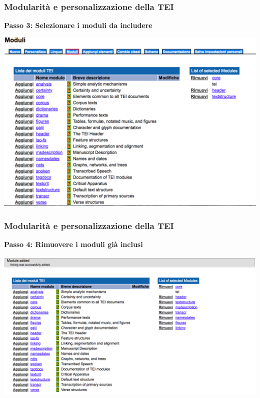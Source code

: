 \begin{frame}
    \frametitle{Modularità e personalizzazione della TEI}
    \addtocounter{nframe}{1}
    
    \textbf{Passo 3: Selezionare i moduli da includere}

     \begin{center}
        \includegraphics[width=.9\textwidth]{imgs/Roma4.png}
     \end{center}
   
    
\end{frame}

\begin{frame}
    \frametitle{Modularità e personalizzazione della TEI}
    \addtocounter{nframe}{1}
    
    \textbf{Passo 4:  Rimuovere i moduli già inclusi}


     \begin{center}
        \includegraphics[width=.97\textwidth]{imgs/Roma5.png}
     \end{center}
   
    
\end{frame}

